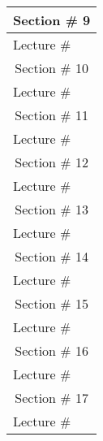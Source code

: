 \begin{center}
\begin{longtable}{ | p{5cm} | p{8cm} | }
        \multicolumn{2}{|c|}{Section \# 9} \\ 
        \hline
        Lecture \# &  \\
        \hline
        \multicolumn{2}{|c|}{Section \# 10} \\ 
        \hline
        Lecture \# &  \\
        \hline
        \multicolumn{2}{|c|}{Section \# 11} \\ 
        \hline
        Lecture \# &  \\
        \hline
        \multicolumn{2}{|c|}{Section \# 12} \\ 
        \hline
        Lecture \# &  \\
        \hline
        \multicolumn{2}{|c|}{Section \# 13} \\ 
        \hline
        Lecture \# &  \\
        \hline
        \multicolumn{2}{|c|}{Section \# 14} \\ 
        \hline
        Lecture \# &  \\
        \hline
        \multicolumn{2}{|c|}{Section \# 15} \\ 
        \hline
        Lecture \# &  \\
        \hline
        \multicolumn{2}{|c|}{Section \# 16} \\ 
        \hline
        Lecture \# &  \\
        \hline
        \multicolumn{2}{|c|}{Section \# 17} \\ 
        \hline
        Lecture \# &  \\
        \hline
   \end{longtable}
\end{center}
